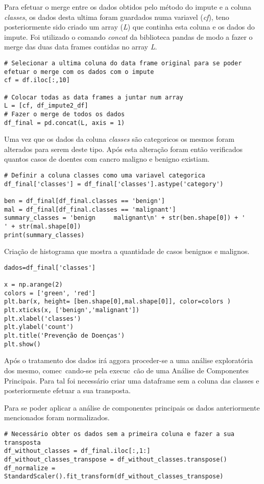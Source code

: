 \documentclass{article}
\begin{document}
Para efetuar o merge entre os dados obtidos pelo m\'etodo do impute e a coluna \textit{classes}, os dados desta ultima foram guardados numa variavel (\textit{cf}), teno posteriormente sido criado um array (\textit{L}) que continha esta coluna e os dados do impute.
Foi utilizado o comando \textit{concat} da biblioteca pandas de modo a fazer o merge das duas data frames contidas no array \textit{L}.

\begin{lstlisting}
# Selecionar a ultima coluna do data frame original para se poder efetuar o merge com os dados com o impute
cf = df.iloc[:,10]

# Colocar todas as data frames a juntar num array
L = [cf, df_impute2_df]
# Fazer o merge de todos os dados
df_final = pd.concat(L, axis = 1)
\end{lstlisting}

Uma vez que os dados da coluna \textit{classes} s\~ao categoricos os mesmos foram alterados para serem deste tipo. Ap\'os esta altera\c c\~ao foram ent\~ao verificados quantos casos de doentes com cancro maligno e benigno existiam.

\begin{lstlisting}
# Definir a coluna classes como uma variavel categorica
df_final['classes'] = df_final['classes'].astype('category')

ben = df_final[df_final.classes == 'benign']
mal = df_final[df_final.classes == 'malignant']
summary_classes = 'benign     malignant\n' + str(ben.shape[0]) + '        ' + str(mal.shape[0])
print(summary_classes)
\end{lstlisting}

Cria\c c\~ao de histograma que mostra a quantidade de casos benignos e malignos.

\begin{lstlisting}
dados=df_final['classes']

x = np.arange(2)
colors = ['green', 'red']
plt.bar(x, height= [ben.shape[0],mal.shape[0]], color=colors )
plt.xticks(x, ['benign','malignant'])
plt.xlabel('classes')
plt.ylabel('count')
plt.title('Prevenção de Doenças')
plt.show()
\end{lstlisting}

Ap\'os o tratamento dos dados ir\'a aggora proceder-se a uma an\'alise explorat\'oria dos mesmo, comec\ cando-se pela execuc\ c\~ao de uma An\'alise de Componentes Principais. Para tal foi necess\'ario criar uma dataframe sem a coluna das classes e posteriormente efetuar a sua transposta. 

Para se poder aplicar a an\'alise de componentes principais os dados anteriormente mencionados foram normalizados.

\begin{lstlisting}
# Necessário obter os dados sem a primeira coluna e fazer a sua transposta
df_without_classes = df_final.iloc[:,1:]
df_without_classes_transpose = df_without_classes.transpose()
df_normalize = StandardScaler().fit_transform(df_without_classes_transpose)
\end{lstlisting}
\end{document}
